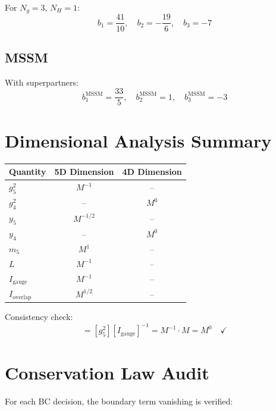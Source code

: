 \documentclass[11pt,a4paper]{article}
\begin{document}
For $N_g = 3$, $N_H = 1$:
\begin{equation}
b_1 = \frac{41}{10}, \quad b_2 = -\frac{19}{6}, \quad b_3 = -7
\label{eq:sm-beta-values}
\end{equation}

\subsection{MSSM}

With superpartners:
\begin{equation}
b_1^{\text{MSSM}} = \frac{33}{5}, \quad b_2^{\text{MSSM}} = 1, \quad b_3^{\text{MSSM}} = -3
\label{eq:mssm-beta}
\end{equation}

\section{Dimensional Analysis Summary}
\label{app:dimensions}

\begin{center}
\begin{tabular}{lcc}
\toprule
Quantity & 5D Dimension & 4D Dimension \\
\midrule
$g_5^2$ & $M^{-1}$ & -- \\
$g_4^2$ & -- & $M^0$ \\
$y_5$ & $M^{-1/2}$ & -- \\
$y_4$ & -- & $M^0$ \\
$m_5$ & $M^1$ & -- \\
$L$ & $M^{-1}$ & -- \\
$I_{\text{gauge}}$ & $M^{-1}$ & -- \\
$I_{\text{overlap}}$ & $M^{1/2}$ & -- \\
\bottomrule
\end{tabular}
\end{center}

Consistency check:
\begin{equation}
[g_4^2] = [g_5^2][I_{\text{gauge}}]^{-1} = M^{-1} \cdot M = M^0 \quad \checkmark
\label{eq:dim-check}
\end{equation}

\section{Conservation Law Audit}
\label{app:conservation}

For each BC decision, the boundary term vanishing is verified:
\end{document}
